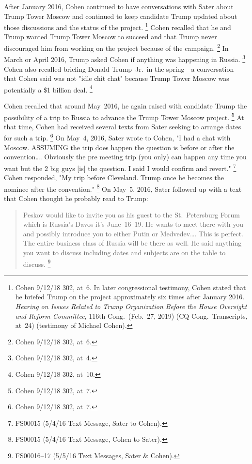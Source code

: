 After January 2016, Cohen continued to have conversations with Sater about Trump Tower Moscow and continued to keep candidate Trump updated about those discussions and the status of the project.%
\footnote{Cohen 9/12/18 302, at~6.
In later congressional testimony, Cohen stated that he briefed Trump on the project approximately six times after January 2016.
\textit{Hearing on Issues Related to Trump Organization Before the House Oversight and Reform Committee}, 116th Cong.\ (Feb.~27, 2019) (CQ Cong.\ Transcripts, at~24) (testimony of Michael Cohen).}
Cohen recalled that he and Trump wanted Trump Tower Moscow to succeed and that Trump never discouraged him from working on the project because of the campaign.%
\footnote{Cohen 9/12/18 302, at~6.}
In March or April 2016, Trump asked Cohen if anything was happening in Russia.%
\footnote{Cohen 9/12/18 302, at~4.}
Cohen also recalled briefing Donald Trump~Jr.\ in the spring---a conversation that Cohen said was not "idle chit chat" because Trump Tower Moscow was potentially a \$1 billion deal.%
\footnote{Cohen 9/12/18 302, at~10.}

Cohen recalled that around May~2016, he again raised with candidate Trump the possibility of a trip to Russia to advance the Trump Tower Moscow project.%
\footnote{Cohen 9/12/18 302, at~7.}
At that time, Cohen had received several texts from Sater seeking to arrange dates for such a trip.%
\footnote{Cohen 9/12/18 302, at~7.}
On May~4, 2016, Sater wrote to Cohen, "I had a chat with Moscow.
ASSUMING the trip does happen the question is before or after the convention\dots.
Obviously the pre meeting trip (you only) can happen any time you want but the 2 big guys [is] the question.
I said I would confirm and revert."%
\footnote{FS00015 (5/4/16 Text Message, Sater to Cohen).}
Cohen responded, "My trip before Cleveland.
Trump once he becomes the nominee after the convention."%
\footnote{FS00015 (5/4/16 Text Message, Cohen to Sater).}
On May~5, 2016, Sater followed up with a text that Cohen thought he probably read to Trump:

\begin{quote}
Peskov would like to invite you as his guest to the St.~Petersburg Forum which is Russia's Davos it's June~16--19.
He wants to meet there with you and possibly introduce you to either Putin or Medvedev\dots.
This is perfect.
The entire business class of Russia will be there as well.
He said anything you want to discuss including dates and subjects are on the table to discuss.%
\footnote{FS00016--17 (5/5/16 Text Messages, Sater \& Cohen).}
\end{quote}


